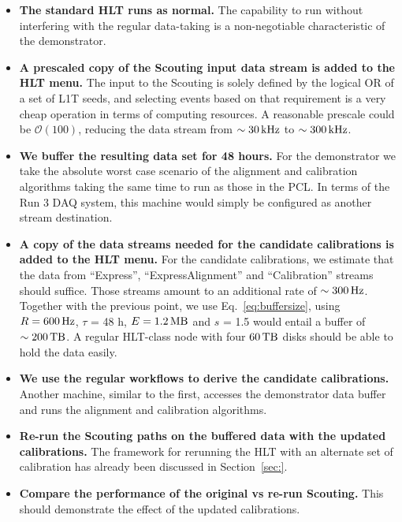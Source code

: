 \begin{itemize}
\item \textbf{The standard HLT runs as normal.} 
The capability to run without interfering with the regular data-taking is
a non-negotiable characteristic of the demonstrator.
\item \textbf{A prescaled copy of the Scouting input data stream is added to the HLT menu.}
The input to the Scouting is solely defined by the logical OR of a set of L1T seeds, and
selecting events based on that requirement is a very cheap operation in terms of computing resources.
A reasonable prescale could be $\mathcal{O}(100)$, reducing the data stream 
from $\sim 30\,\text{kHz}$
to $\sim 300\,\text{kHz}$.
\item \textbf{We buffer the resulting data set for 48 hours.}
For the demonstrator we take the absolute worst case scenario of the alignment and calibration algorithms taking the same time to run as those in the PCL.
In terms of the Run 3 DAQ system, this machine would simply be configured as another stream destination.
\item \textbf{A copy of the data streams needed for the candidate calibrations is added to the HLT menu.}
For the candidate calibrations, we estimate that 
the data from ``Express'', ``ExpressAlignment'' and ``Calibration'' streams should suffice.
Those streams amount to an additional rate of $\sim 300\,\text{Hz}$.
Together with the previous point, we
use Eq.~\ref{eq:buffersize}, using 
$R = 600\,\text{Hz}$,
$\tau$ = 48 h,
$E = 1.2\,\text{MB}$ and
$s$ = 1.5
would entail a buffer of $\sim 200\,\text{TB}$.
A regular HLT-class node with four $60\,\text{TB}$ disks should be able to hold the data easily.
\item \textbf{We use the regular workflows to derive the candidate calibrations.}
Another machine, similar to the first, accesses the demonstrator data buffer
and
runs the alignment and calibration algorithms.
\item \textbf{Re-run the Scouting paths on the buffered data with the updated calibrations.}
The framework for rerunning the HLT with an alternate set of calibration has already been discussed in Section~\ref{sec:}.
\item \textbf{Compare the performance of the original vs re-run Scouting.}
This should demonstrate the effect of the updated calibrations. 
\end{itemize}



